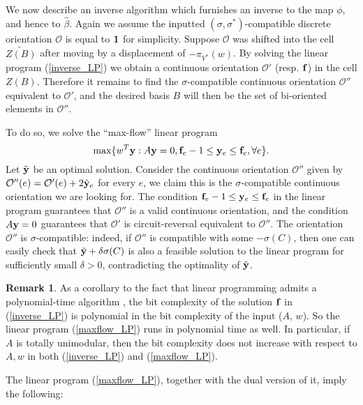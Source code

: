 \documentclass[12pt]{amsart}
\numberwithin{equation}{section}
\theoremstyle{definition}
\newtheorem{remark}[theorem]{Remark}
\begin{document}
We now describe an inverse algorithm which furnishes an inverse to the map $\phi$, and hence to $\hat{\beta}$.
Again we assume the inputted $(\sigma,\sigma^*)$-compatible discrete orientation $\mathcal{O}$ is equal to ${\bf 1}$ for simplicity.
Suppose $\mathcal{O}$ was shifted into the cell $\widetilde{Z(B)}$ after moving by a displacement of $-\pi_{V^*}(w)$. By solving the linear program (\ref{inverse_LP}) we obtain a continuous orientation $\mathcal{O}'$ (resp. ${\bf f}$) in the cell $Z(B)$.
Therefore it remains to find the $\sigma$-compatible continuous orientation $\mathcal{O}''$ equivalent to $\mathcal{O}'$, and the desired basis $B$ will then be the set of bi-oriented elements in $\mathcal{O}''$.

To do so, we solve the ``max-flow'' linear program 
\begin{equation}\label{maxflow_LP}
\max\{w^T{\bf y}: A{\bf y}=0, {\bf f}_e-1\leq {\bf y}_e\leq {\bf f}_e,\forall e\}.
\end{equation}
Let $\tilde{\bf y}$ be an optimal solution.
Consider the continuous orientation $\mathcal{O}''$ given by $\mathcal{O}''(e)=\mathcal{O}'(e)+2\tilde{\bf y}_e$ for every $e$, we claim this is the $\sigma$-compatible continuous orientation we are looking for. 
The condition ${\bf f}_e-1\leq {\bf y}_e\leq {\bf f}_e$ in the linear program guarantees that $\mathcal{O}''$ is a valid continuous orientation, and the condition $A{\bf y}=0$ guarantees that $\mathcal{O}'$ is circuit-reversal equivalent to $\mathcal{O}''$. 
The orientation $\mathcal{O}''$ is $\sigma$-compatible: indeed, if $\mathcal{O}''$ is compatible with some $-\sigma(C)$, then one can easily check that $\tilde{\bf y}+\delta \sigma(C)$ is also a feasible solution to the linear program for sufficiently small $\delta>0$, contradicting the optimality of $\tilde{\bf y}$.

\begin{remark}
As a corollary to the fact that linear programming admits a polynomial-time algorithm \cite{schrijver1986LP}, the bit complexity of the solution ${\bf f}$ in (\ref{inverse_LP}) is polynomial in the bit complexity of the input ($A$, $w$). So the linear program (\ref{maxflow_LP}) runs in polynomial time as well. In particular, if $A$ is totally unimodular, then the bit complexity does not increase with respect to $A,w$ in both (\ref{inverse_LP}) and (\ref{maxflow_LP}).
\end{remark}

The linear program (\ref{maxflow_LP}), together with the dual version of it, imply the following:
\end{document}
